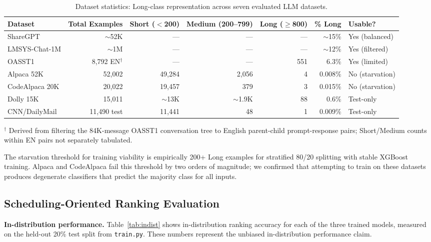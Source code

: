 \documentclass[10pt,letterpaper]{article}
\begin{document}
\begin{table}[t]
\centering
\caption{Dataset statistics: Long-class representation across seven evaluated LLM datasets.}
\label{tab:datasets}
\small
\begin{tabular}{lrrrrrl}
\toprule
Dataset & Total Examples & Short ($<$200) & Medium (200--799) & Long ($\geq$800) & \% Long & Usable? \\
\midrule
ShareGPT       & ${\sim}$52K        & ---    & ---    & ---  & ${\sim}$15\% & Yes (balanced) \\
LMSYS-Chat-1M  & ${\sim}$1M         & ---    & ---    & ---  & ${\sim}$12\% & Yes (filtered) \\
OASST1         & 8,792 EN$^\dagger$ & ---    & ---    & 551  & 6.3\%        & Yes (limited) \\
Alpaca 52K     & 52,002             & 49,284 & 2,056  & 4    & 0.008\%      & No (starvation) \\
CodeAlpaca 20K & 20,022             & 19,457 & 379    & 3    & 0.015\%      & No (starvation) \\
Dolly 15K      & 15,011             & ${\sim}$13K & ${\sim}$1.9K & 88 & 0.6\% & Test-only \\
CNN/DailyMail  & 11,490 test        & 11,441 & 48     & 1    & 0.009\%      & Test-only \\
\bottomrule
\end{tabular}
\smallskip\noindent\footnotesize{$^\dagger$ Derived from filtering the 84K-message OASST1 conversation tree to English parent-child prompt-response pairs; Short/Medium counts within EN pairs not separately tabulated.}
\end{table}

The starvation threshold for training viability is empirically 200+ Long examples for stratified 80/20 splitting with stable XGBoost training. Alpaca and CodeAlpaca fail this threshold by two orders of magnitude; we confirmed that attempting to train on these datasets produces degenerate classifiers that predict the majority class for all inputs.

\subsection{Scheduling-Oriented Ranking Evaluation}

\textbf{In-distribution performance.} Table~\ref{tab:indist} shows in-distribution ranking accuracy for each of the three trained models, measured on the held-out 20\% test split from \texttt{train.py}. These numbers represent the unbiased in-distribution performance claim.
\end{document}
